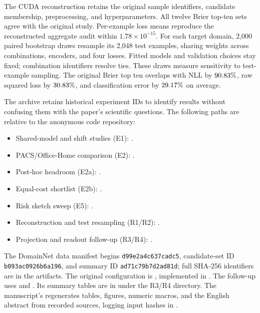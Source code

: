 \documentclass{article}
\begin{document}
The CUDA reconstruction retains the original sample identifiers, candidate membership, preprocessing, and hyperparameters. All twelve Brier top-ten sets agree with the original study. Per-example loss means reproduce the reconstructed aggregate audit within $1.78\times10^{-15}$. For each target domain, 2,000 paired bootstrap draws resample its 2,048 test examples, sharing weights across combinations, encoders, and four losses. Fitted models and validation choices stay fixed; combination identifiers resolve ties. These draws measure sensitivity to test-example sampling. The original Brier top ten overlaps with NLL by $90.83\%$, raw squared loss by $30.83\%$, and classification error by $29.17\%$ on average.

The archive retains historical experiment IDs to identify results without confusing them with the paper's scientific questions. The following paths are relative to the anonymous code repository:
\begin{itemize}
\item Shared-model and shift studies (E1): .
\item PACS/Office-Home comparison (E2): .
\item Post-hoc headroom (E2a): .
\item Equal-cost shortlist (E2b): .
\item Risk sketch sweep (E5): .
\item Reconstruction and test resampling (R1/R2): .
\item Projection and readout follow-up (R3/R4): .
\end{itemize}
{\raggedright
The DomainNet data manifest begins \texttt{d99e2a4c637cadc5}, candidate-set ID \texttt{b093ac0926b6a196}, and summary ID \texttt{ad71c79b7d2ad81d}; full SHA-256 identifiers are in the artifacts. The original configuration is , implemented in . The follow-up uses  and . Its summary tables are in  under the R3/R4 directory. The manuscript's  regenerates tables, figures, numeric macros, and the English abstract from recorded sources, logging input hashes in .\par}
\end{document}
